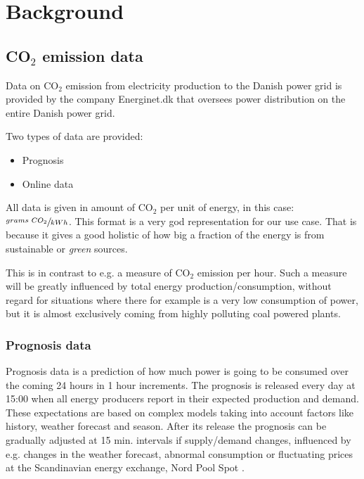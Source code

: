 \documentclass[Main]{subfiles}
\begin{document}
\section{Background} %
\label{sec:background}

	\subsection{CO$_2$ emission data} %
	\label{sub:c02_emission_data}

		Data on CO$_2$ emission from electricity production to the Danish power grid is provided by the company Energinet.dk that oversees power distribution on the entire Danish power grid.

		Two types of data are provided:
		\begin{itemize}
			\item Prognosis \cite{EnerginetFTPPrognosis:Online}
			\item Online data \cite{EnerginetFTPOnline:Online}
		\end{itemize}

		All data is given in amount of CO$_2$ per unit of energy, in this case: 
		$\sfrac{grams\ CO_2}{kWh}$.
		This format is a very god representation for our use case.
		That is because it gives a good holistic of how big a fraction of the energy is from sustainable or \emph{green} sources.
		
		This is in contrast to e.g. a measure of CO$_2$ emission per hour.
		Such a measure will be greatly influenced by total energy production/consumption, without regard for situations where there for example is a very low consumption of power, but it is almost exclusively coming from highly polluting coal powered plants.

		\subsubsection{Prognosis data} %
		\label{sub:prognosis}
			Prognosis data is a prediction of how much power is going to be consumed over the coming 24 hours in 1 hour increments.
			The prognosis is released every day at 15:00 when all energy producers report in their expected production and demand.
			These expectations are based on complex models taking into account factors like history, weather forecast and season.
			After its release the prognosis can be gradually adjusted at 15 min. intervals if supply/demand changes, influenced by e.g. changes in the weather forecast, abnormal consumption or fluctuating prices at the Scandinavian energy exchange, Nord Pool Spot \cite{NordPool:Online}.
\end{document}
